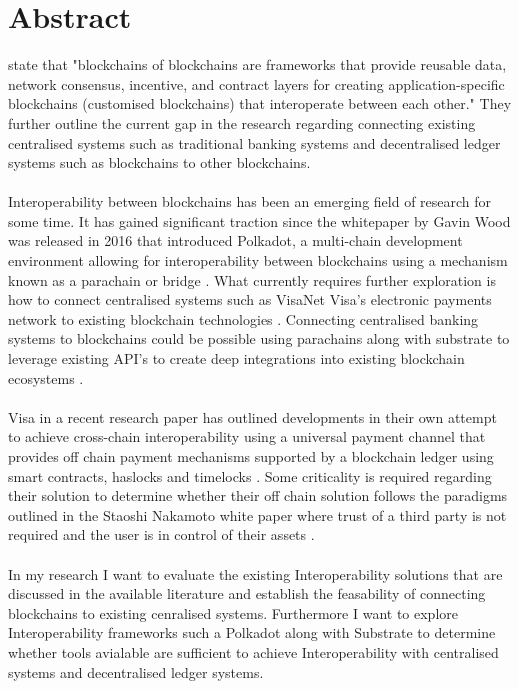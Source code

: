 \documentclass[12pt]{article}
\begin{document}
\section{Abstract}
\autocite{belchiorSurveyBlockchainInteroperability2021}
state that "blockchains of blockchains are frameworks that provide reusable data, network consensus, incentive, 
and contract layers for creating application-specific blockchains (customised blockchains) that interoperate between each other."
They further outline the current gap in the research regarding connecting existing centralised systems such as traditional banking
systems and decentralised ledger systems such as blockchains to other blockchains.
\\\\
Interoperability between blockchains has been an emerging field of
research for some time. It has gained significant traction since the whitepaper by Gavin Wood was released in 2016 that introduced Polkadot, 
a multi-chain development environment allowing for interoperability between blockchains using a mechanism known as a parachain or bridge \autocite{woodPOLKADOTVISIONHETEROGENEOUS2016}.
What currently requires further exploration is how to connect centralised systems such as VisaNet Visa's electronic payments network to existing blockchain technologies \autocite{VisaNetTechnologyVisa}.
Connecting centralised banking systems to blockchains could be possible using parachains along with substrate to leverage existing API's to create deep integrations into existing blockchain ecosystems \autocite{polkadotPolkadotDecoded20202021}.
\\\\ 
Visa in a recent research paper has outlined developments in their own attempt to achieve cross-chain interoperability using a universal payment channel that provides off chain payment mechanisms 
supported by a blockchain ledger using smart contracts, haslocks and timelocks \autocite{christodorescuUniversalPaymentChannels2021}. Some criticality is required regarding their solution to determine whether their off chain solution follows the paradigms
outlined in the Staoshi Nakamoto white paper where trust of a third party is not required and the user is in control of their assets \autocite{nakamotoBitcoinPeertoPeerElectronic}.
\\\\
In my research I want to evaluate the existing Interoperability solutions that are discussed in the available literature and establish the feasability of connecting blockchains to existing cenralised systems.
Furthermore I want to explore Interoperability frameworks such a Polkadot along with Substrate to determine whether tools avialable are sufficient to achieve Interoperability with centralised systems and decentralised ledger systems.
\end{document}
